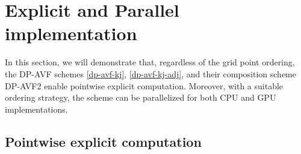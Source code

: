 \documentclass[fleqn,11pt]{elsarticle}
\numberwithin{equation}{section}
\begin{document}

\section{Explicit and Parallel implementation}\label{sec:4}

In this section,  we will demonstrate that, regardless of the grid point ordering, the DP-AVF schemes \eqref{dp-avf-kj}, \eqref{dp-avf-kj-adj}, and their composition scheme DP-AVF2 enable pointwise explicit computation. Moreover, with a suitable ordering strategy, the scheme can be parallelized for both CPU and GPU implementations.

\subsection{Pointwise explicit computation}
\end{document}
